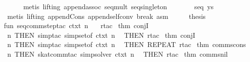 \begin{isabellebody}
\ \ \ \ \isamarkupfalse%
\ {}metis\ {}lifting{}\ append{}assoc\ seq{}mult\ seq{}singleton{}\isanewline
\ \ \isamarkupfalse%
\ \isamarkupfalse%
\ {}{}{}{}\ {}\ seq\ ys{}\isanewline
\ \ \ \ \isamarkupfalse%
\ {}metis\ {}lifting{}\ append{}Cons\ append{}self{}conv{}\ break\ asm{}{}\isanewline
\ \ \isamarkupfalse%
\ \isamarkupfalse%
\ {}thesis\ \isamarkupfalse%
\isanewline
{}\isamarkupfalse%
%
\endisatagproof
{\isafoldproof}%
%
\isadelimproof
\isanewline
%
\endisadelimproof
%
\isadelimML
\isanewline
%
\endisadelimML
%
\isatagML
{}\isamarkupfalse%
\ {}\isanewline
fun\ seq{}comm{}step{}tac\ ctxt\ n\ {}\isanewline
\ \ rtac\ %
\isaantiq
thm\ conjI{}%
\endisaantiq
\ n\ THEN\ simp{}tac\ {}simpset{}of\ ctxt{}\ n\isanewline
\ \ THEN\ rtac\ %
\isaantiq
thm\ conjI{}%
\endisaantiq
\ n\ THEN\ simp{}tac\ {}simpset{}of\ ctxt{}\ n\isanewline
\ \ THEN\ REPEAT\ {}rtac\ %
\isaantiq
thm\ comms{}cons{}%
\endisaantiq
\ n\ THEN\ skat{}comm{}tac\ simp{}solver\ ctxt\ n{}\isanewline
\ \ THEN\ rtac\ %
\isaantiq
thm\ comms{}nil{}%

\end{isabellebody}
